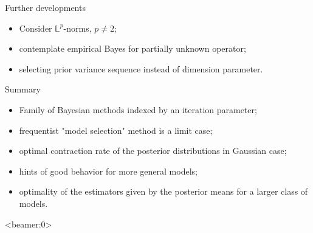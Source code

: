 \documentclass[10pt]{beamer}
\begin{document}

\begin{frame}{Further developments}
\begin{itemize}
\setlength\itemsep{2em}
\item Consider $\mathbb{L}^{p}$-norms, $p \neq 2$;
\item contemplate empirical Bayes for partially unknown operator;
\item selecting prior variance sequence instead of dimension parameter.
\end{itemize}
\end{frame}

\begin{frame}{Summary}
\begin{itemize}
\setlength\itemsep{2em}
\item Family of Bayesian methods indexed by an iteration parameter;
\item frequentist "model selection" method  is a limit case;
\item optimal contraction rate of the posterior distributions in Gaussian case;
\item hints of good behavior for more general models;
\item optimality of the estimators given by the posterior means for a larger class of models.
\end{itemize}
\end{frame}

\begin{frame}<beamer:0>

\end{frame}

\end{document}
